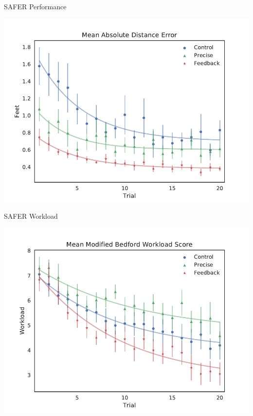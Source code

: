 \documentclass[10pt]{beamer}
\begin{document}
\begin{frame}[fragile]{SAFER Performance}
  \begin{center}
    \includegraphics[width=\textwidth]{../img/Group_absDistErr_clean_fit_30.pdf}
  \end{center}
\end{frame}

\begin{frame}[fragile]{SAFER Workload}
  \begin{center}
    \includegraphics[width=\textwidth]{../img/Group_Workload_fit_30.pdf}
  \end{center}
\end{frame}
\end{document}
